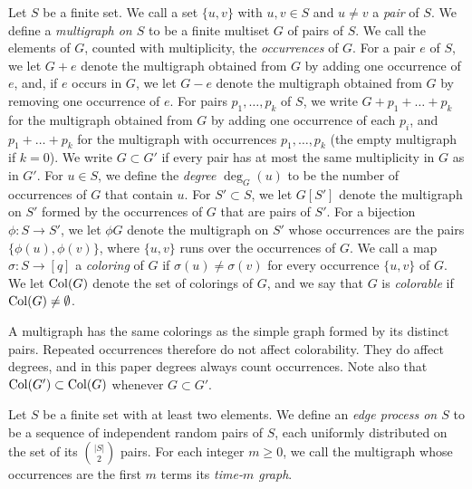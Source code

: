\begin{definition}\label{def:pre-multigraph}
Let $S$ be a finite set. We call a set $\{u, v\}$ with $u, v \in S$ and $u \ne v$ a \emph{pair} of $S$. We define a \emph{multigraph on $S$} to be a finite multiset $G$ of pairs of $S$. We call the elements of $G$, counted with multiplicity, the \emph{occurrences} of $G$. For a pair $e$ of $S$, we let $G + e$ denote the multigraph obtained from $G$ by adding one occurrence of $e$, and, if $e$ occurs in $G$, we let $G - e$ denote the multigraph obtained from $G$ by removing one occurrence of $e$. For pairs $p_1, \dots, p_k$ of $S$, we write $G + p_1 + \dots + p_k$ for the multigraph obtained from $G$ by adding one occurrence of each $p_i$, and $p_1 + \dots + p_k$ for the multigraph with occurrences $p_1, \dots, p_k$ (the empty multigraph if $k = 0$). We write $G \subset G'$ if every pair has at most the same multiplicity in $G$ as in $G'$. For $u \in S$, we define the \emph{degree} $\deg_G(u)$ to be the number of occurrences of $G$ that contain $u$. For $S' \subset S$, we let $G[S']$ denote the multigraph on $S'$ formed by the occurrences of $G$ that are pairs of $S'$. For a bijection $\phi \colon S \to S'$, we let $\phi G$ denote the multigraph on $S'$ whose occurrences are the pairs $\{\phi(u), \phi(v)\}$, where $\{u, v\}$ runs over the occurrences of $G$. We call a map $\sigma\colon S \to [q]$ a \emph{coloring} of $G$ if $\sigma(u) \ne \sigma(v)$ for every occurrence $\{u, v\}$ of $G$. We let $\operatorname{Col}(G)$ denote the set of colorings of $G$, and we say that $G$ is \emph{colorable} if $\operatorname{Col}(G) \neq \emptyset$.
\end{definition}

A multigraph has the same colorings as the simple graph formed by its distinct pairs. Repeated occurrences therefore do not affect colorability. They do affect degrees, and in this paper degrees always count occurrences. Note also that $\operatorname{Col}(G') \subset \operatorname{Col}(G)$ whenever $G \subset G'$.

\begin{definition}\label{def:pre-process}
Let $S$ be a finite set with at least two elements. We define an \emph{edge process on $S$} to be a sequence of independent random pairs of $S$, each uniformly distributed on the set of its $\binom{|S|}{2}$ pairs. For each integer $m \ge 0$, we call the multigraph whose occurrences are the first $m$ terms its \emph{time-$m$ graph}.
\end{definition}

